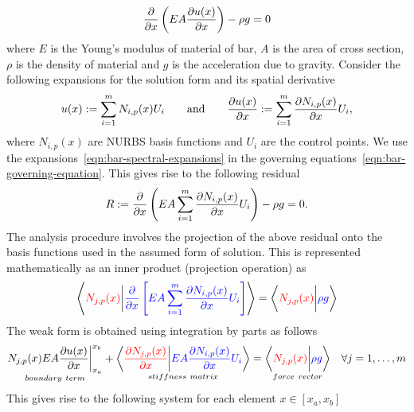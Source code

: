 \documentclass[submit,12pt]{aiaa-pretty} %
\begin{document}
\begin{equation}\label{eqn:bar-governing-equation}
  \dfrac{\partial }{\partial x} \left( EA \dfrac{\partial u(x)}{\partial x} \right) - \rho g  = 0
\end{equation}
where $E$ is the Young's modulus of material of bar, $A$ is the area
of cross section, $\rho$ is the density of material and $g$ is the
acceleration due to gravity. Consider the following expansions for the
solution form and its spatial derivative
\begin{equation}\label{eqn:bar-spectral-expansions}
  u(x) := \sum_{i=1}^{m} N_{i,p}(x) U_i \qquad \mathrm{and} \qquad \dfrac{\partial u(x)}{\partial x} := \sum_{i=1}^{m} \dfrac{\partial N_{i,p}(x)}{\partial x}  U_i,
\end{equation}
where $N_{i,p}(x)$ are NURBS basis functions and $U_i$ are the control
points. We use the expansions~\eqref{eqn:bar-spectral-expansions} in
the governing equations~\eqref{eqn:bar-governing-equation}. This gives
rise to the following residual
\begin{equation}\label{eqn:bar-governing-equation}
  R := \dfrac{\partial }{\partial x} \left( EA  \sum_{i=1}^{m} \dfrac{\partial N_{i,p}(x)}{\partial x}  U_i \right) - \rho g  = 0.
\end{equation}
The analysis procedure involves the projection of the above residual
onto the basis functions used in the assumed form of solution. This is
represented mathematically as an inner product (projection operation) as
\begin{equation}\nonumber
  \left\langle  {\color{red}{N_{j,p}(x)}} \bigg\vert {\color{blue}{\dfrac{\partial }{\partial x} \left[ EA \sum_{i=1}^{m} \dfrac{\partial N_{i,p}(x)}{\partial x}  U_i  \right]}} \right\rangle  =
  \left\langle  {\color{red}{N_{j,p}(x)}} \bigg\vert {\color{blue}{\rho g}} \right\rangle 
\end{equation}
The weak form is obtained using integration by parts as follows
\begin{equation}\nonumber
  \begin{gathered}
    \underset{boundary~term}{{{N_{j,p}(x) EA \dfrac{\partial u(x)}{\partial x}}}  \bigg\vert_{x_a}^{x_b}} +  \underset{stiffness~matrix}{\left\langle {\color{red}{\dfrac{\partial N_{j,p}(x)}{\partial x}}}  \bigg\vert  {\color{blue}{EA  \dfrac{\partial N_{i,p}(x)}{\partial x}  U_i}}   \right\rangle}  = 
    \underset{force~vector}{\left\langle {\color{red}{N_{j,p}(x)}} \bigg\vert {\color{blue}{\rho g}} \right\rangle} \quad \forall j = 1, \ldots,m
  \end{gathered}
\end{equation}
This gives rise to the following system for each element $x \in [x_a,
  x_b]$
\end{document}
